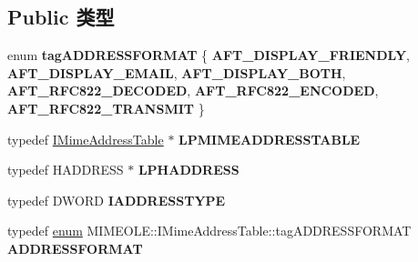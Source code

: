\subsection*{Public 类型}
\begin{DoxyCompactItemize}
\item 
\mbox{\label{interface_m_i_m_e_o_l_e_1_1_i_mime_address_table_ad24270d1e1e9d5a7c726bada91de451f}} 
enum {\bfseries tag\+A\+D\+D\+R\+E\+S\+S\+F\+O\+R\+M\+AT} \{ \newline
{\bfseries A\+F\+T\+\_\+\+D\+I\+S\+P\+L\+A\+Y\+\_\+\+F\+R\+I\+E\+N\+D\+LY}, 
{\bfseries A\+F\+T\+\_\+\+D\+I\+S\+P\+L\+A\+Y\+\_\+\+E\+M\+A\+IL}, 
{\bfseries A\+F\+T\+\_\+\+D\+I\+S\+P\+L\+A\+Y\+\_\+\+B\+O\+TH}, 
{\bfseries A\+F\+T\+\_\+\+R\+F\+C822\+\_\+\+D\+E\+C\+O\+D\+ED}, 
\newline
{\bfseries A\+F\+T\+\_\+\+R\+F\+C822\+\_\+\+E\+N\+C\+O\+D\+ED}, 
{\bfseries A\+F\+T\+\_\+\+R\+F\+C822\+\_\+\+T\+R\+A\+N\+S\+M\+IT}
 \}
\item 
\mbox{\label{interface_m_i_m_e_o_l_e_1_1_i_mime_address_table_a299b92aa1a3acdffe809273215f9528a}} 
typedef \hyperlink{interface_m_i_m_e_o_l_e_1_1_i_mime_address_table}{I\+Mime\+Address\+Table} $\ast$ {\bfseries L\+P\+M\+I\+M\+E\+A\+D\+D\+R\+E\+S\+S\+T\+A\+B\+LE}
\item 
\mbox{\label{interface_m_i_m_e_o_l_e_1_1_i_mime_address_table_ad1cc29b9036f611817bccf1132f512a7}} 
typedef H\+A\+D\+D\+R\+E\+SS $\ast$ {\bfseries L\+P\+H\+A\+D\+D\+R\+E\+SS}
\item 
\mbox{\label{interface_m_i_m_e_o_l_e_1_1_i_mime_address_table_a8e4bad9792fafea62fa6ce89e328d7e5}} 
typedef D\+W\+O\+RD {\bfseries I\+A\+D\+D\+R\+E\+S\+S\+T\+Y\+PE}
\item 
\mbox{\label{interface_m_i_m_e_o_l_e_1_1_i_mime_address_table_a1a38be9ec001638a0be4e23693a492a1}} 
typedef \hyperlink{interfaceenum}{enum} M\+I\+M\+E\+O\+L\+E\+::\+I\+Mime\+Address\+Table\+::tag\+A\+D\+D\+R\+E\+S\+S\+F\+O\+R\+M\+AT {\bfseries A\+D\+D\+R\+E\+S\+S\+F\+O\+R\+M\+AT}
\item 
\mbox{\label{interface_m_i_m_e_o_l_e_1_1_i_mime_address_table_a11302e8216a105ac0ae595916c93507a}} 

\end{DoxyCompactItemize}
